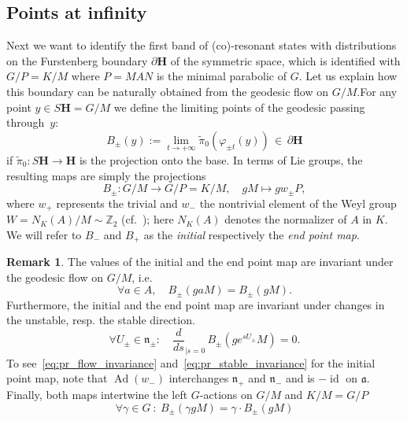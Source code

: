 \documentclass[10pt]{amsart}
\theoremstyle{definition}
\newtheorem{rema}[cdrthm]{Remark}
\DeclareMathOperator{\id}{id}
\DeclareMathOperator{\Ad}{Ad}
\newcommand{\bfh}{\mathbf{H}}
\newcommand{\pl}{\partial}
\newcommand{\til}{\widetilde}
\newcommand{\Z}{\mathbb Z}
\newcommand{\n}{\mathfrak n}
\let\oldforall\forall
\renewcommand*{\forall}{\mathrel{\oldforall}}
\begin{document}
\subsection{Points at infinity}
Next we want to identify the first band of (co)-resonant states with distributions on the Furstenberg boundary $\pl{\bfh}$ of the symmetric space, which is identified with $G/P=K/M$ where $P=MAN$ is the minimal parabolic of $G$. Let us explain how this boundary can be naturally obtained from the geodesic flow on $G/M$.\linebreak For any point $y\in S{\bfh}=G/M$ we define the limiting points of the geodesic passing through~$y$:
\[
B_\pm(y):=\lim_{t\to +\infty}\til\pi_0(\varphi_{\pm t}(y))\,\in\,\pl{\bfh}
\]
if $\til\pi_0:S{\bfh}\to {\bfh}$ is the projection onto the base. In terms of Lie groups, the resulting maps are simply the projections
\begin{equation}\label{eq:initial_end_point_map}
B_\pm\colon G/M \to G/P=K/M,\quad gM\mapsto gw_\pm P,
\end{equation}
where $w_+$ represents the trivial and $w_-$ the nontrivial element of the Weyl group\linebreak$W=N_K(A)/M\sim \Z_2$ (cf.~\cite{DFG15,Hi05,HHS12}); here $N_K(A)$ denotes the normalizer of $A$ in $K$. We will refer to $B_-$ and $B_+$ as the \emph{initial} respectively the \emph{end point map}.


\begin{rema}\label{lem:projection_properties}
The values of the initial and the end point map are invariant under the geodesic flow on $G/M$, i.e.
\begin{equation}\label{eq:pr_flow_invariance}
\forall a\in A, \quad B_{\pm}(gaM)=B_{\pm}(gM).
\end{equation}
Furthermore, the initial and the end point map are invariant under changes in the unstable, resp. the stable direction.
\begin{equation}\label{eq:pr_stable_invariance}
\forall U_\pm\in \n_\pm :\quad \frac{d}{ds}_{|s=0}\,B_\pm \left(ge^{s U_\pm}M\right)=0.
\end{equation}
To see~\eqref{eq:pr_flow_invariance} and~\eqref{eq:pr_stable_invariance} for the initial point map, note that $\Ad(w_-)$ interchanges $\n_+$ and $\n_-$ and is $-\id$ on $\mathfrak a$. Finally, both maps intertwine the left $G$-actions on $G/M$ and $K/M=G/P$
\begin{equation}\label{eq:pr_intertwining}
\forall \gamma\in G~:~B_\pm(\gamma gM) = \gamma\cdot B_\pm(gM)
\end{equation}
\end{rema}
\end{document}
